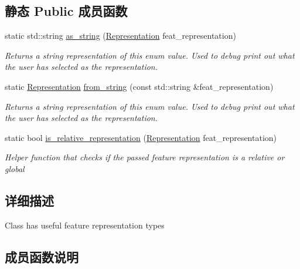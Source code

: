 \subsection*{静态 Public 成员函数}
\begin{DoxyCompactItemize}
\item 
static std\+::string \hyperlink{classov__type_1_1LandmarkRepresentation_ab20d64d87c0d661cd343cdd7814d8264}{as\+\_\+string} (\hyperlink{classov__type_1_1LandmarkRepresentation_a7f5783df6932ace7f098ae243b6d298e}{Representation} feat\+\_\+representation)
\begin{DoxyCompactList}\small\item\em Returns a string representation of this enum value. Used to debug print out what the user has selected as the representation. \end{DoxyCompactList}\item 
static \hyperlink{classov__type_1_1LandmarkRepresentation_a7f5783df6932ace7f098ae243b6d298e}{Representation} \hyperlink{classov__type_1_1LandmarkRepresentation_a730830f7d0235f40f4266d0a66895e50}{from\+\_\+string} (const std\+::string \&feat\+\_\+representation)
\begin{DoxyCompactList}\small\item\em Returns a string representation of this enum value. Used to debug print out what the user has selected as the representation. \end{DoxyCompactList}\item 
static bool \hyperlink{classov__type_1_1LandmarkRepresentation_a67860ca8360c71fa8c1ae3f99a2378c1}{is\+\_\+relative\+\_\+representation} (\hyperlink{classov__type_1_1LandmarkRepresentation_a7f5783df6932ace7f098ae243b6d298e}{Representation} feat\+\_\+representation)
\begin{DoxyCompactList}\small\item\em Helper function that checks if the passed feature representation is a relative or global \end{DoxyCompactList}\end{DoxyCompactItemize}


\subsection{详细描述}
Class has useful feature representation types 

\subsection{成员函数说明}
\mbox{\label{classov__type_1_1LandmarkRepresentation_ab20d64d87c0d661cd343cdd7814d8264}} 
